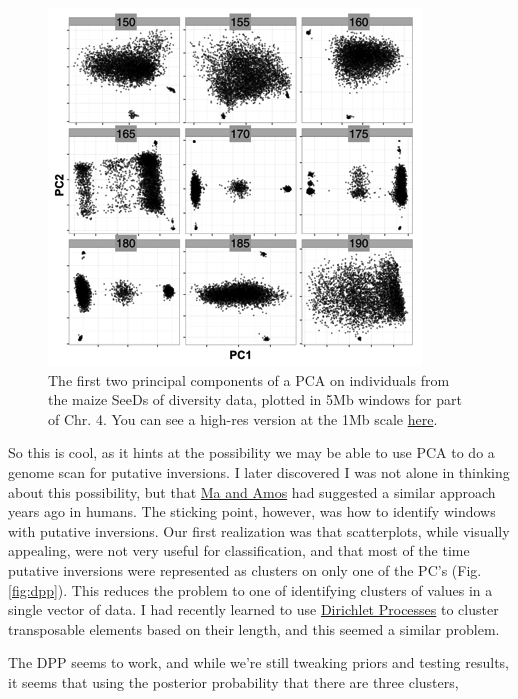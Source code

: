 \documentclass[]{article}
\begin{document}
\begin{figure}[h]   
  \begin{center}
   \includegraphics[width=0.7\linewidth]{inversions_pca.png}
   \caption{ The first two principal components of a PCA on individuals from the maize SeeDs of diversity data, plotted in 5Mb windows for part of Chr. 4. You can see a high-res version at the 1Mb scale \href{https://github.com/RILAB/fruitcase/blob/master/figures/inversion_scan.pdf}{here}.} 
    \label{fig:pcs}
  \end{center}
\end{figure}

So this is cool, as it hints at the possibility we may be able to use PCA to do a genome scan for putative inversions. 
I later discovered I was not alone in thinking about this possibility, but that \href{http://journals.plos.org/plosone/article?id=10.1371/journal.pone.0040224}{Ma and Amos} had suggested a similar approach years ago in humans.  
The sticking point, however, was how to identify windows with putative inversions.  
Our first realization was that  scatterplots, while visually appealing,  were not very useful for classification, and that most of the time putative inversions were represented as clusters on only one of the PC's (Fig. \ref{fig:dpp}).  
This reduces the problem to one of identifying clusters of values in a single vector of data. 
I had recently learned to use \href{https://en.wikipedia.org/wiki/Dirichlet_process}{Dirichlet Processes} to cluster transposable elements based on their length, and this seemed a similar problem. 

The DPP seems to work, and while we're still tweaking priors and testing results, it seems that using the posterior probability that there are three clusters,
\end{document}
